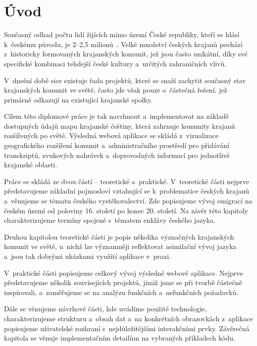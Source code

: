 \hypertarget{uxfavod}{%
\chapter*{Úvod}\label{uvod}}

Současný odhad počtu lidí žijících mimo území České republiky, kteří se hlásí k~českému původu, je 2--2,5 milionů~\parencite{Krajane-mv2}. Velké množství českých krajanů pochází z~historicky formovaných krajanských komunit, jež jsou často unikátní, díky své specifické kombinaci tehdejší české kultury a~určitých zahraničních vlivů.

V~dnešní době sice existuje řada projektů, které se snaží zachytit současný stav krajanských komunit ve světě, často jde však pouze o~částečná řešení, jež primárně odkazují na existující krajanské spolky.

Cílem této diplomové práce je tak navrhnout a~implementovat na základě dostupných údajů mapu krajanské češtiny, která zahrnuje komunity krajanů rozšířených po světě. Výsledná webová aplikace se skládá z~vizualizace geografického rozšíření komunit a~administračního prostředí pro přidávání transkriptů, zvukových nahrávek a~doprovodných informací pro jednotlivé krajanské oblasti.

Práce se skládá ze dvou částí -- teoretické a~praktické. V~teoretické části nejprve představujeme základní pojmosloví vztahující se k~problematice českých krajanů a~věnujeme se tématu českého vystěhovalectví. Zde popisujeme vývoj emigrací na českém území od poloviny 16. století po konec 20. století. Na závěr této kapitoly charakterizujeme termíny spojené s~tématem enklávy českého jazyka.

Druhou kapitolou teoretické části je popis několika význačných krajanských komunit ve světě, u~nichž lze významněji reflektovat asimilační vývoj jazyka a~jsou tak dobrými ukázkami využití aplikace v~praxi.

V~praktické části popisujeme celkový vývoj výsledné webové aplikace. Nejprve představujeme několik souvisejících projektů, jimiž jsme se při tvorbě částečně inspirovali, a~zaměřujeme se na analýzu funkčních a~nefunkčních požadavků.

Dále se věnujeme návrhové části, kde uvádíme použité technologie, charakterizujeme strukturu a~obsah dat a~na konkrétních obrazovkách z~aplikace popisujeme uživatelské rozhraní s~nejdůležitějšími interakčními prvky. Závěrečná kapitola se věnuje implementačním detailům na vybraných příkladech kódu.
